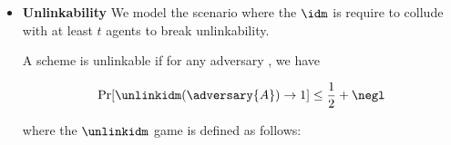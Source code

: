 \begin{itemize}
\begin{definition}
\end{definition}

  \item \textbf{Unlinkability} We model the scenario where the $\idm$ is require to collude with at least $t$ agents to break unlinkability.

\begin{definition}[Unlinkability]
A \primitive scheme is unlinkable if for any \ppt adversary  , we have

\begin{align*}
    \Pr[\unlinkidm(\adversary{A}) \rightarrow 1] \le \frac{1}{2} + \negl
\end{align*}

where the $\unlinkidm$ game is defined as follows:

\begin{pchstack}[center, space=0.2cm, boxed]
\begin{pcvstack}


\end{pcvstack}
\end{pchstack}
\end{definition}
\end{itemize}
